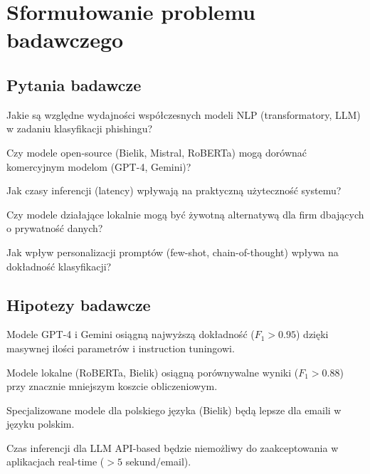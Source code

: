 \documentclass[11pt]{extreport}
\begin{document}
\chapter{Sformułowanie problemu badawczego}
\label{ch:problem}

\section{Pytania badawcze}
\label{sec:pytania}

\begin{description}[style=nextline]
    \item[\textbf{P1:}] Jakie są względne wydajności współczesnych modeli NLP (transformatory, LLM) w zadaniu klasyfikacji phishingu?
    
    \item[\textbf{P2:}] Czy modele open-source (Bielik, Mistral, RoBERTa) mogą dorównać komercyjnym modelom (GPT-4, Gemini)?
    
    \item[\textbf{P3:}] Jak czasy inferencji (latency) wpływają na praktyczną użyteczność systemu?
    
    \item[\textbf{P4:}] Czy modele działające lokalnie mogą być żywotną alternatywą dla firm dbających o prywatność danych?
    
    \item[\textbf{P5:}] Jak wpływ personalizacji promptów (few-shot, chain-of-thought) wpływa na dokładność klasyfikacji?
\end{description}

\section{Hipotezy badawcze}
\label{sec:hipotezy}

\begin{description}[style=nextline]
    \item[\textbf{H1:}] Modele GPT-4 i Gemini osiągną najwyższą dokładność ($F_1 > 0.95$) dzięki masywnej ilości parametrów i instruction tuningowi.
    
    \item[\textbf{H2:}] Modele lokalne (RoBERTa, Bielik) osiągną porównywalne wyniki ($F_1 > 0.88$) przy znacznie mniejszym koszcie obliczeniowym.
    
    \item[\textbf{H3:}] Specjalizowane modele dla polskiego języka (Bielik) będą lepsze dla emaili w języku polskim.
    
    \item[\textbf{H4:}] Czas inferencji dla LLM API-based będzie niemożliwy do zaakceptowania w aplikacjach real-time ($> 5$ sekund/email).
\end{description}
\end{document}
